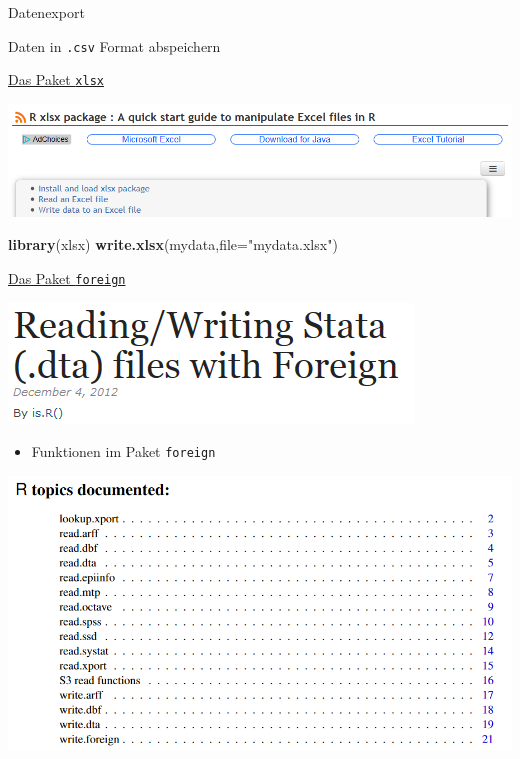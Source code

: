 \documentclass[ignorenonframetext,]{beamer}
\newenvironment{Shaded}{}{}
\newcommand{\KeywordTok}[1]{\textcolor[rgb]{0.00,0.44,0.13}{\textbf{{#1}}}}
\newcommand{\DataTypeTok}[1]{\textcolor[rgb]{0.56,0.13,0.00}{{#1}}}
\newcommand{\StringTok}[1]{\textcolor[rgb]{0.25,0.44,0.63}{{#1}}}
\newcommand{\NormalTok}[1]{{#1}}
\providecommand{\tightlist}{%
\setlength{\itemsep}{0pt}\setlength{\parskip}{0pt}}
\begin{document}
\begin{frame}[fragile]{Datenexport}
\begin{block}{Daten in \texttt{.csv} Format abspeichern}
\end{block}

\begin{block}{\href{http://www.sthda.com/english/wiki/r-xlsx-package-a-quick-start-guide-to-manipulate-excel-files-in-r\#read-an-excel-file}{Das
Paket \texttt{xlsx}}}

\includegraphics{./tex2pdf.9796/f8e4fe7da5e630832ec7e1566b80a8d388b852cb.png}

\begin{Shaded}
\begin{Highlighting}[]
\KeywordTok{library}\NormalTok{(xlsx)}
\KeywordTok{write.xlsx}\NormalTok{(mydata,}\DataTypeTok{file=}\StringTok{"mydata.xlsx"}\NormalTok{) }
\end{Highlighting}
\end{Shaded}

\end{block}

\begin{block}{\href{https://www.r-bloggers.com/readingwriting-stata-dta-files-with-foreign/}{Das
Paket \texttt{foreign}}}

\includegraphics{./tex2pdf.9796/cacdeac9e2a94bf873762c46b11f6576b5bf7fd2.png}

\begin{itemize}
\tightlist
\item
  Funktionen im Paket \texttt{foreign}
\end{itemize}

\includegraphics{./tex2pdf.9796/127b4a21c6edd4bea1001fe04e85f4f5a06b9ec8.png}


\end{block}
\end{frame}
\end{document}
